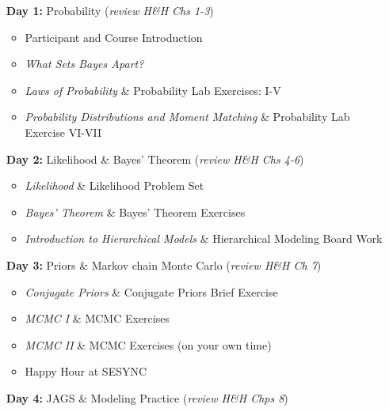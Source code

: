 \documentclass[11pt]{article}
\begin{document}
\begin{enumerate}
\item[\textbf{Day 1:}] Probability (\emph{review H\&H Chs 1-3})

\begin{itemize}
\item Participant and Course Introduction %
\item \emph{What Sets Bayes Apart?} %
\item \emph{Laws of Probability} \& Probability Lab Exercises: I-V %
\item \emph{Probability Distributions and Moment Matching} \& Probability Lab Exercise VI-VII %
\end{itemize}

\item[\textbf{Day 2:}] Likelihood \& Bayes' Theorem (\emph{review H\&H Chs 4-6})

\begin{itemize}
\item \emph{Likelihood} \& Likelihood Problem Set %
\item \emph{Bayes' Theorem}  \& Bayes' Theorem Exercises  %
\item \emph{Introduction to Hierarchical Models} \& Hierarchical Modeling Board Work  %
\end{itemize}


\item[\textbf{Day 3:}] Priors \& Markov chain Monte Carlo (\emph{review H\&H Ch 7})

\begin{itemize}
\item \emph{Conjugate Priors} \& Conjugate Priors Brief Exercise 
\item \emph{MCMC I} \& MCMC Exercises  %
\item \emph{MCMC II} \& MCMC Exercises (on your own time) %
\item Happy Hour at SESYNC 
\end{itemize}


\item[\textbf{Day 4:}] JAGS \& Modeling Practice (\emph{review H\&H Chps 8})


\end{enumerate}
\end{document}
